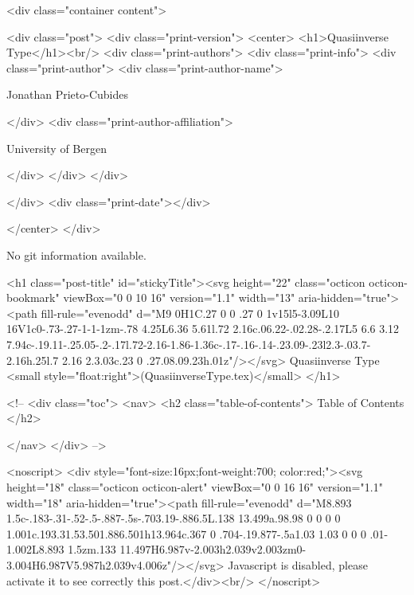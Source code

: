       <div class="container content">
        







<div class="post">
  <div class="print-version">
    <center>
      <h1>Quasiinverse Type</h1><br/>
        <div class="print-authors">
          <div class="print-info">
            <div class="print-author">
              <div class="print-author-name">
                
                  Jonathan Prieto-Cubides
                
              </div>
              <div class="print-author-affiliation">
                
                  University of Bergen
                
                </div>
            </div>
          </div>
          
          
        </div>
        <div class="print-date"></div>
        
        
    </center>
  </div>

  
  No git information available.
  

  <h1 class="post-title" id="stickyTitle"><svg height="22" class="octicon octicon-bookmark" viewBox="0 0 10 16" version="1.1" width="13" aria-hidden="true"><path fill-rule="evenodd" d="M9 0H1C.27 0 0 .27 0 1v15l5-3.09L10 16V1c0-.73-.27-1-1-1zm-.78 4.25L6.36 5.61l.72 2.16c.06.22-.02.28-.2.17L5 6.6 3.12 7.94c-.19.11-.25.05-.2-.17l.72-2.16-1.86-1.36c-.17-.16-.14-.23.09-.23l2.3-.03.7-2.16h.25l.7 2.16 2.3.03c.23 0 .27.08.09.23h.01z"/></svg> Quasiinverse Type <small style="float:right">(QuasiinverseType.tex)</small>
  </h1>

  <!-- 
  <div class="toc">
    <nav>
    <h2 class="table-of-contents"> Table of Contents </h2>
      

    </nav>
  </div>
   -->

  <noscript>
  <div style="font-size:16px;font-weight:700; color:red;"><svg height="18" class="octicon octicon-alert" viewBox="0 0 16 16" version="1.1" width="18" aria-hidden="true"><path fill-rule="evenodd" d="M8.893 1.5c-.183-.31-.52-.5-.887-.5s-.703.19-.886.5L.138 13.499a.98.98 0 0 0 0 1.001c.193.31.53.501.886.501h13.964c.367 0 .704-.19.877-.5a1.03 1.03 0 0 0 .01-1.002L8.893 1.5zm.133 11.497H6.987v-2.003h2.039v2.003zm0-3.004H6.987V5.987h2.039v4.006z"/></svg> Javascript is disabled, please activate it to see correctly this post.</div><br/>
  </noscript>

